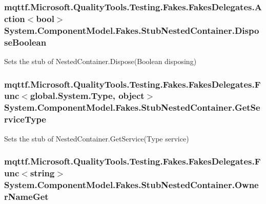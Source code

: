 \hypertarget{class_system_1_1_component_model_1_1_fakes_1_1_stub_nested_container_ab48f6070f9993a0c3cf19a0519f9795e}{
\subsubsection[{Dispose\-Boolean}]{\setlength{\rightskip}{0pt plus 5cm}mqttf.\-Microsoft.\-Quality\-Tools.\-Testing.\-Fakes.\-Fakes\-Delegates.\-Action$<$bool$>$ System.\-Component\-Model.\-Fakes.\-Stub\-Nested\-Container.\-Dispose\-Boolean}}\label{class_system_1_1_component_model_1_1_fakes_1_1_stub_nested_container_ab48f6070f9993a0c3cf19a0519f9795e}


Sets the stub of Nested\-Container.\-Dispose(\-Boolean disposing)

\hypertarget{class_system_1_1_component_model_1_1_fakes_1_1_stub_nested_container_aa47a15c759da362f40e7da80086198dd}{
\subsubsection[{Get\-Service\-Type}]{\setlength{\rightskip}{0pt plus 5cm}mqttf.\-Microsoft.\-Quality\-Tools.\-Testing.\-Fakes.\-Fakes\-Delegates.\-Func$<$global.\-System.\-Type, object$>$ System.\-Component\-Model.\-Fakes.\-Stub\-Nested\-Container.\-Get\-Service\-Type}}\label{class_system_1_1_component_model_1_1_fakes_1_1_stub_nested_container_aa47a15c759da362f40e7da80086198dd}


Sets the stub of Nested\-Container.\-Get\-Service(\-Type service)

\hypertarget{class_system_1_1_component_model_1_1_fakes_1_1_stub_nested_container_ac6651c73c63512b06d3c5d5df3119a0a}{
\subsubsection[{Owner\-Name\-Get}]{\setlength{\rightskip}{0pt plus 5cm}mqttf.\-Microsoft.\-Quality\-Tools.\-Testing.\-Fakes.\-Fakes\-Delegates.\-Func$<$string$>$ System.\-Component\-Model.\-Fakes.\-Stub\-Nested\-Container.\-Owner\-Name\-Get}}\label{class_system_1_1_component_model_1_1_fakes_1_1_stub_nested_container_ac6651c73c63512b06d3c5d5df3119a0a}


